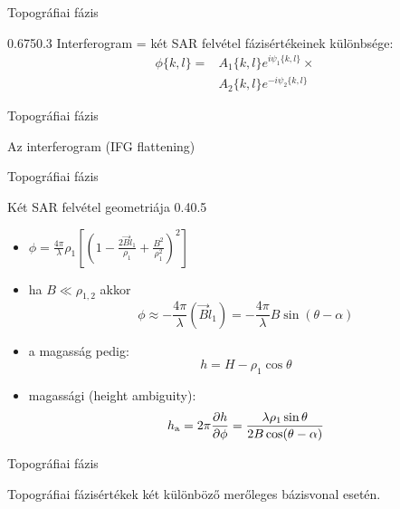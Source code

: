 \def\ft{Topográfiai fázis}


\begin{frame}{\ft}
    \begin{figp}{}{}{0.675}{0.3}
        Interferogram = két SAR felvétel fázisértékeinek különbsége:
        \begin{align*}
            \phi\{k,l\} = & A_1\{k,l\} e^{i\psi_1\{k,l\}} \times \\
                          & A_2\{k,l\} e^{-i\psi_2\{k,l\}}
        \end{align*}
    \end{figp}
\end{frame}


\begin{frame}{\ft}
    \begin{minic}{0.6}
        \centering
        
        Az interferogram  (IFG flattening)
    \end{minic}
\end{frame}


\begin{frame}{\ft}
    \begin{figp}{}{Két SAR felvétel geometriája \cite{BurgmannInSAR}}{0.4}{0.5}
        \begin{itemize}
            \item $\phi = \frac{4\pi}{\lambda}\rho_1\left[\left(1 - \frac{2 \vec{B}\hat{l}_1}{\rho_1} + \frac{B^2}{\rho_1^2}\right)^2\right]$
            \item ha $B \ll \rho_{1,2}$ akkor $$\phi \approx - \frac{4\pi}{\lambda} (\vec{B}\hat{l}_1) = - \frac{4\pi}{\lambda} B \sin(\theta - \alpha)$$
            \item a magasság pedig: $$h = H - \rho_1 \cos\theta$$
            \item magassági  (height ambiguity): $$h_{\text{a}} = 2\pi \frac{\partial h}{\partial \phi} = \frac{\lambda\rho_1\sin\theta}{2B\cos(\theta - \alpha)}$$
        \end{itemize}
    \end{figp}
\end{frame}


\begin{frame}{\ft}
    \centering
    
    Topográfiai fázisértékek két különböző merőleges bázisvonal esetén.
\end{frame}

